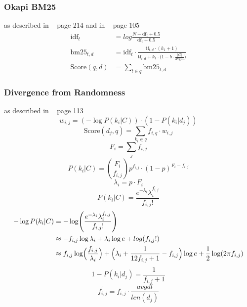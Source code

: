 \subsubsection{Okapi BM25}
\label{sec:okapi_bm25}
as described in ~\cite{manning2008} page 214 and in ~\cite{ModernInvormationRetrieval1999} page 105
\begin{equation}
  \begin{split}
    \text{idf}_t & = log \frac{N - \text{df}_t + 0.5}{\text{df}_t + 0.5} \\
    \text{bm25}_{t, d} & = \text{idf}_t \cdot \frac{\text{tf}_{t, d} \cdot (k_1 + 1)}{\text{tf}_{t, d} + k_1 \cdot \bigl(1 - b \cdot \frac{|G|}{\text{avgdl}}\bigr)}  \\
    \text{Score}(q, d) & = \sum_{t \in q}\text{bm25}_{t, d}
  \end{split}
\end{equation}


\subsubsection{Divergence from Randomness}
\label{sec:divergence_from_randomness}

as described in ~\cite{ModernInvormationRetrieval1999} page 113
\begin{equation}
  w_{i, j} = (- \log P(k_i | C)) \cdot (1 - P(k_i | d_j))
\end{equation}
\begin{equation}
  \text{Score}(d_j, q) = \sum_{k_i \in q} f_{i, q} \cdot w_{i, j}
\end{equation}
\begin{equation}
  F_i = \sum_j f_{i, j}
\end{equation}
\begin{equation}
  P(k_i | C) = \binom{F_i}{f_{i, j}}p^{f_{i, j}} \cdot (1 - p)^{F_i - f_{i, j}}
\end{equation}
\begin{equation}
  \lambda_i = p \cdot F_i
\end{equation}
\begin{equation}
  P(k_i | C) = \frac{e^{-\lambda_i}\lambda_i^{f_{i, j}}}{f_{i, j}!}
\end{equation}
\begin{equation}
  \begin{split}
    - \log P(k_i | C) & = -\log\Biggl(\frac{e^{-\lambda_i}\lambda_i^{f_{i, j}}}{f_{i, j}!}\Biggr) \\
    & \approx -f_{i,j} \log \lambda_i + \lambda_i \log e + log(f_{i,j}!) \\
    & \approx f_{i, j} \log \Bigl( \frac{f_{i, j}}{\lambda_i} \Bigr) + \Bigl( \lambda_i + \frac{1}{12 f_{i, j} + 1} - f_{i, j}\Bigr) \log e + \frac{1}{2} \log(2 \pi f_{i, j})
  \end{split}
\end{equation}
\begin{equation}
  1 - P(k_i | d_j) = \frac{1}{f_{i, j} + 1}
\end{equation}
\begin{equation}
  f^{\prime}_{i, j} = f_{i, j} \cdot \frac{avgdl}{len(d_j)}
\end{equation}


